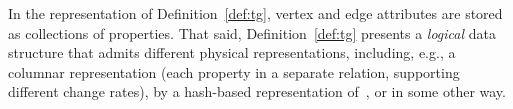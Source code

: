 In the \tg representation of Definition~\ref{def:tg}, vertex and edge
attributes are stored as collections of properties.  That said,
Definition~\ref{def:tg} presents a {\em logical} data structure that
admits different physical representations, including, e.g., a columnar
representation (each property in a separate relation, supporting
different change rates), by a hash-based representation
of~\cite{DBLP:conf/sigmod/SunFSKHX15}, or in some other way.

